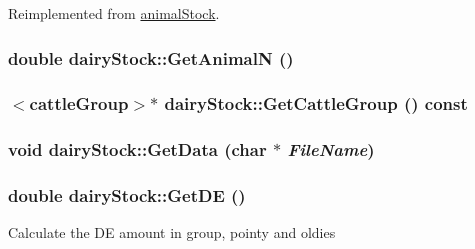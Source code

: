 Reimplemented from \hyperlink{classanimal_stock_ab95f31939d8d1cbc1bb2f567375995ae}{animalStock}.\hypertarget{classdairy_stock_a15856795254b0a1e9d5fb82925647899}{
\subsubsection[{GetAnimalN}]{\setlength{\rightskip}{0pt plus 5cm}double dairyStock::GetAnimalN ()}}
\label{classdairy_stock_a15856795254b0a1e9d5fb82925647899}
\hypertarget{classdairy_stock_aa0df5d9ea7cd74dd41369e4830548fb8}{
\subsubsection[{GetCattleGroup}]{$<${\bf cattleGroup}$>$$\ast$ dairyStock::GetCattleGroup () const}}
\label{classdairy_stock_aa0df5d9ea7cd74dd41369e4830548fb8}
\hypertarget{classdairy_stock_ac675c0d6567e2a68d63b5e63dd9cf5a2}{
\subsubsection[{GetData}]{\setlength{\rightskip}{0pt plus 5cm}void dairyStock::GetData (char $\ast$ {\em FileName})}}
\label{classdairy_stock_ac675c0d6567e2a68d63b5e63dd9cf5a2}
\hypertarget{classdairy_stock_aad94cb740f4ee70763adede5f4c4844c}{
\subsubsection[{GetDE}]{\setlength{\rightskip}{0pt plus 5cm}double dairyStock::GetDE ()}}
\label{classdairy_stock_aad94cb740f4ee70763adede5f4c4844c}
Calculate the DE amount in group, pointy and oldies 

